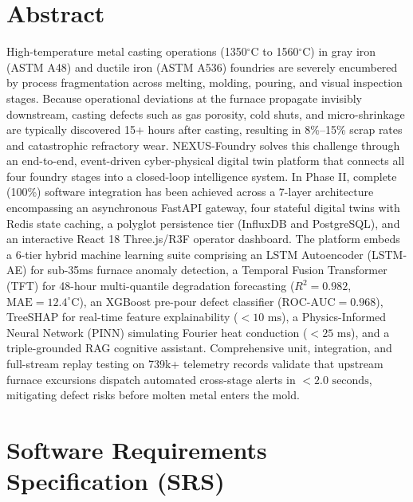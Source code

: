 \documentclass[11pt, a4paper]{article}
\begin{document}
\section{Abstract}
\noindent
High-temperature metal casting operations (1350$^\circ$C to 1560$^\circ$C) in gray iron (ASTM A48) and ductile iron (ASTM A536) foundries are severely encumbered by process fragmentation across melting, molding, pouring, and visual inspection stages. Because operational deviations at the furnace propagate invisibly downstream, casting defects such as gas porosity, cold shuts, and micro-shrinkage are typically discovered 15+ hours after casting, resulting in 8\%--15\% scrap rates and catastrophic refractory wear. NEXUS-Foundry solves this challenge through an end-to-end, event-driven cyber-physical digital twin platform that connects all four foundry stages into a closed-loop intelligence system. In Phase II, complete (100\%) software integration has been achieved across a 7-layer architecture encompassing an asynchronous FastAPI gateway, four stateful digital twins with Redis state caching, a polyglot persistence tier (InfluxDB and PostgreSQL), and an interactive React 18 Three.js/R3F operator dashboard. The platform embeds a 6-tier hybrid machine learning suite comprising an LSTM Autoencoder (LSTM-AE) for sub-35ms furnace anomaly detection, a Temporal Fusion Transformer (TFT) for 48-hour multi-quantile degradation forecasting ($R^2 = 0.982$, $\text{MAE} = 12.4^\circ\text{C}$), an XGBoost pre-pour defect classifier ($\text{ROC-AUC} = 0.968$), TreeSHAP for real-time feature explainability ($<10\text{ ms}$), a Physics-Informed Neural Network (PINN) simulating Fourier heat conduction ($<25\text{ ms}$), and a triple-grounded RAG cognitive assistant. Comprehensive unit, integration, and full-stream replay testing on 739k+ telemetry records validate that upstream furnace excursions dispatch automated cross-stage alerts in $<2.0\text{ seconds}$, mitigating defect risks before molten metal enters the mold.

\section{Software Requirements Specification (SRS)}
\end{document}

